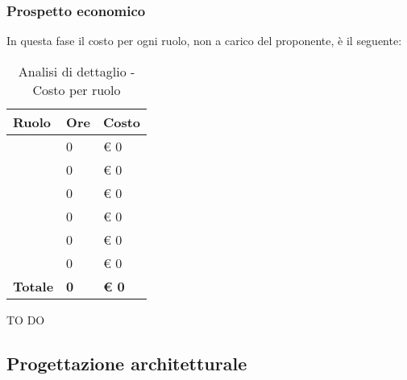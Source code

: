 		\subsubsection{Prospetto economico} %
		\label{ssub:prospetto_economico}
		In questa fase il costo per ogni ruolo, non a carico del proponente, è il seguente: \\
			\begin{table}[!h]
				\begin{center}
					\begin{tabularx}{0.6\textwidth}{|l|l|X|}
						\hline
						\textbf{Ruolo} & \textbf{Ore} & \textbf{Costo} \\
						\hline
						\roleProjectManager & 0 & \euro{} 0 \\
						\hline
						\roleAnalyst & 0 & \euro{} 0 \\
						\hline
						\roleDesigner & 0 & \euro{} 0 \\
						\hline
						\roleAdministrator & 0 & \euro{} 0 \\
						\hline
						\roleProgrammer & 0 & \euro{} 0 \\
						\hline
						\roleVerifier & 0 & \euro{} 0 \\
						\hline
						\textbf{Totale} & \textbf{0} & \textbf{\euro{} 0} \\
						\hline
					\end{tabularx}
				\end{center}
			\caption{Analisi di dettaglio - Costo per ruolo}
			\end{table}

		\noindent
		TO DO
		
	
	\subsection{Progettazione architetturale} %
	\label{sub:progettazione_architetturale}
